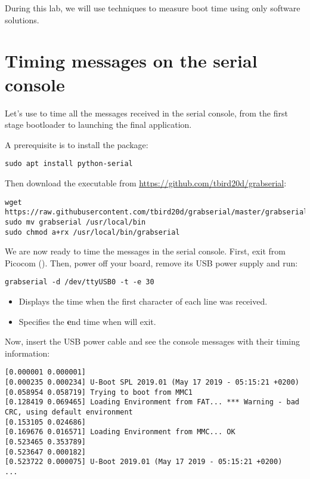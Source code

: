 
During this lab, we will use techniques to measure boot time using only
software solutions.

\section{Timing messages on the serial console}

Let's use  to time all the messages received in the
serial console, from the first stage bootloader to launching the final
application.

A prerequisite is to install the  package:
\begin{verbatim}
sudo apt install python-serial
\end{verbatim}

Then download the  executable from
\url{https://github.com/tbird20d/grabserial}:

\begin{verbatim}
wget https://raw.githubusercontent.com/tbird20d/grabserial/master/grabserial
sudo mv grabserial /usr/local/bin
sudo chmod a+rx /usr/local/bin/grabserial
\end{verbatim}

We are now ready to time the messages in the serial console. First, exit
from Picocom (\code{[Ctrl][a] [Ctrl][x]}). Then, power off your board,
remove its USB power supply and run:

\begin{verbatim}
grabserial -d /dev/ttyUSB0 -t -e 30
\end{verbatim}

\begin{itemize}
\item {} Displays the time when the first character of each line
was received.
\item {} Specifies the {\bf e}nd time when 
will exit.
\end{itemize}

Now, insert the USB power cable and see the console messages with their
timing information:

\begin{verbatim}
[0.000001 0.000001] 
[0.000235 0.000234] U-Boot SPL 2019.01 (May 17 2019 - 05:15:21 +0200)
[0.058954 0.058719] Trying to boot from MMC1
[0.128419 0.069465] Loading Environment from FAT... *** Warning - bad CRC, using default environment
[0.153105 0.024686] 
[0.169676 0.016571] Loading Environment from MMC... OK
[0.523465 0.353789] 
[0.523647 0.000182] 
[0.523722 0.000075] U-Boot 2019.01 (May 17 2019 - 05:15:21 +0200)
...
\end{verbatim}

